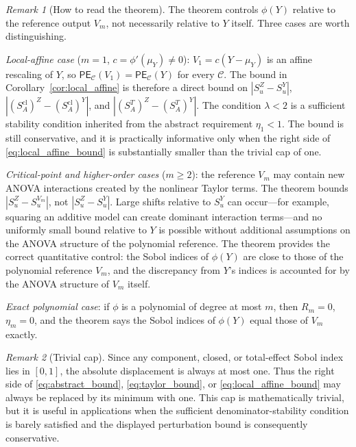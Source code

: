 \documentclass[11pt,letterpaper]{article}
\theoremstyle{remark}
\newtheorem*{remark}{Remark}
\begin{document}
\begin{remark}[How to read the theorem]
The theorem controls $\phi(Y)$ relative to the reference output $V_m$, not
necessarily relative to $Y$ itself. Three cases are worth distinguishing.

\emph{Local-affine case} ($m=1$, $c=\phi'(\mu_Y)\neq0$): $V_1=c(Y-\mu_Y)$ is
an affine rescaling of $Y$, so $\mathsf{PE}_{\mathscr C}(V_1)=\mathsf{PE}_{\mathscr C}(Y)$
for every $\mathscr C$. The bound in Corollary~\ref{cor:local_affine} is
therefore a direct bound on $|S_u^Z-S_u^Y|$, $|(S_A^{\mathrm{cl}})^Z-(S_A^{\mathrm{cl}})^Y|$,
and $|(S_A^T)^Z-(S_A^T)^Y|$. The condition $\lambda<2$ is a sufficient
stability condition inherited from the abstract requirement $\eta_1<1$. The
bound is still conservative, and it is practically informative only when the
right side of \eqref{eq:local_affine_bound} is substantially smaller than the
trivial cap of one.

\emph{Critical-point and higher-order cases} ($m\geq2$): the reference $V_m$
may contain new ANOVA interactions created by the nonlinear Taylor terms. The
theorem bounds $|S_u^Z-S_u^{V_m}|$, not $|S_u^Z-S_u^Y|$. Large shifts
relative to $S_u^Y$ can occur---for example, squaring an additive model can
create dominant interaction terms---and no uniformly small bound relative to
$Y$ is possible without additional assumptions on the ANOVA structure of the
polynomial reference. The theorem provides the correct quantitative control:
the Sobol indices of $\phi(Y)$ are close to those of the polynomial reference
$V_m$, and the discrepancy from $Y$'s indices is accounted for by the ANOVA
structure of $V_m$ itself.

\emph{Exact polynomial case}: if $\phi$ is a polynomial of degree at most $m$,
then $R_m=0$, $\eta_m=0$, and the theorem says the Sobol indices of $\phi(Y)$
equal those of $V_m$ exactly.
\end{remark}

\begin{remark}[Trivial cap]
Since any component, closed, or total-effect Sobol index lies in $[0,1]$, the
absolute displacement is always at most one. Thus the right side of
\eqref{eq:abstract_bound}, \eqref{eq:taylor_bound}, or
\eqref{eq:local_affine_bound} may always be replaced by its minimum with one.
This cap is mathematically trivial, but it is useful in applications when the
sufficient denominator-stability condition is barely satisfied and the displayed
perturbation bound is consequently conservative.
\end{remark}
\end{document}
